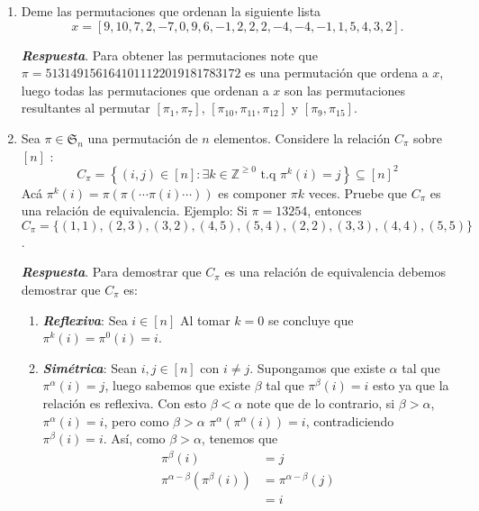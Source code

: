 \documentclass{report}
\begin{document}
    \pagebreak

    \begin{enumerate}
        \item Deme las permutaciones que ordenan la siguiente lista
        $$
        x=[9,10,7,2,-7,0,9,6,-1,2,2,2,-4,-4,-1,1,5,4,3,2] .
        $$

        \textit{\textbf{Respuesta}}. Para obtener las permutaciones note que $\pi = 5 13 14 9 15 6 16 4 10 11 12 20 19 18 17 8 3 1 7 2$ es una permutación que ordena a $x$, luego todas las permutaciones que ordenan a $x$ son las permutaciones resultantes al permutar $[\pi_1, \pi_7]$, $[\pi_{10}, \pi_{11}, \pi_{12}]$ y $[\pi_9, \pi_{15}]$.
        \item Sea $\pi \in \mathfrak{S}_n$ una permutación de $n$ elementos. Considere la relación $C_\pi$ sobre $[n]$ :
        $$
        C_\pi=\left\{(i, j) \in[n]: \exists k \in \mathbb{Z}^{\geq 0} \text { t.q } \pi^k(i)=j\right\} \subseteq[n]^2
        $$
        Acá $\pi^k(i)=\pi(\pi(\cdots \pi(i) \cdots))$ es componer $\pi k$ veces. Pruebe que $C_\pi$ es una relación de equivalencia.
        Ejemplo: Si $\pi=13254$, entonces $C_\pi=\{(1,1),(2,3),(3,2),(4,5),(5,4), (2,2), (3,3), (4,4), (5,5)\}$.

        \textit{\textbf{Respuesta}}. Para demostrar que $C_\pi$ es una relación de equivalencia debemos demostrar que $C_\pi$ es:

        \begin{enumerate}
            \item \textit{\textbf{Reflexiva}}: Sea $i \in [n]$ Al tomar $k = 0$ se concluye que $\pi^k(i) = \pi^0(i) = i$.
            \item \textit{\textbf{Simétrica}}: Sean $i,j \in [n]$ con $i \not = j$. Supongamos que existe $\alpha$ tal que $\pi^\alpha(i) = j$, luego sabemos que existe $\beta$ tal que $\pi^\beta(i) = i$ esto ya que la relación es reflexiva. Con esto $\beta < \alpha$ note que de lo contrario, si $\beta > \alpha$, $\pi^\alpha(i) = i$, pero como $\beta > \alpha$ $\pi^\alpha(\pi^\alpha(i)) = i$, contradiciendo $\pi^\beta(i) = i$. Así, como $\beta > \alpha$, tenemos que
            \begin{align*}
                \pi^\beta(i) &= j\\
                \pi^{\alpha-\beta}(\pi^\beta(i))&= \pi^{\alpha-\beta}(j)\\
                &= i
            \end{align*}


\end{enumerate}
\end{enumerate}
\end{document}
